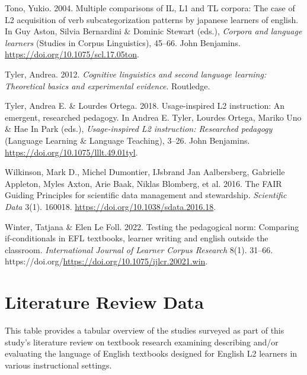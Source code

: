 \documentclass[
  letterpaper,
  DIV=11,
  numbers=noendperiod]{scrreprt}
\newlength{\cslhangindent}
\newenvironment{CSLReferences}[2] %
 {\begin{list}{}{%
  \setlength{\itemindent}{0pt}
  \setlength{\leftmargin}{0pt}
  \setlength{\parsep}{0pt}
  \ifodd #1
   \setlength{\leftmargin}{\cslhangindent}
   \setlength{\itemindent}{-1\cslhangindent}
  \fi
  \setlength{\itemsep}{#2\baselineskip}}}
 {\end{list}}
\begin{document}
\begin{CSLReferences}{1}{0}
Tono, Yukio. 2004. Multiple comparisons of IL, L1 and TL corpora: The
case of L2 acquisition of verb subcategorization patterns by japanese
learners of english. In Guy Aston, Silvia Bernardini \& Dominic Stewart
(eds.), \emph{Corpora and language learners} (Studies in Corpus
Linguistics), 45--66. John Benjamins.
\url{https://doi.org/10.1075/scl.17.05ton}.

Tyler, Andrea. 2012. \emph{Cognitive linguistics and second language
learning: Theoretical basics and experimental evidence}. Routledge.

Tyler, Andrea E. \& Lourdes Ortega. 2018. Usage-inspired L2 instruction:
An emergent, researched pedagogy. In Andrea E. Tyler, Lourdes Ortega,
Mariko Uno \& Hae In Park (eds.), \emph{Usage-inspired L2 instruction:
Researched pedagogy} (Language Learning \& Language Teaching), 3--26.
John Benjamins. \url{https://doi.org/10.1075/lllt.49.01tyl}.

Wilkinson, Mark D., Michel Dumontier, IJsbrand Jan Aalbersberg,
Gabrielle Appleton, Myles Axton, Arie Baak, Niklas Blomberg, et al.
2016. The FAIR Guiding Principles for scientific data management and
stewardship. \emph{Scientific Data} 3(1). 160018.
\url{https://doi.org/10.1038/sdata.2016.18}.

Winter, Tatjana \& Elen Le Foll. 2022. Testing the pedagogical norm:
Comparing if-conditionals in EFL textbooks, learner writing and english
outside the classroom. \emph{International Journal of Learner Corpus
Research} 8(1). 31--66.
https://doi.org/\url{https://doi.org/10.1075/ijlcr.20021.win}.

\end{CSLReferences}

\cleardoublepage
{}
{}
\appendix

\chapter{Literature Review Data}\label{literature-review-data}

This table provides a tabular overview of the studies surveyed as part
of this study's literature review on textbook research examining
describing and/or evaluating the language of English textbooks designed
for English L2 learners in various instructional settings.
\end{document}
